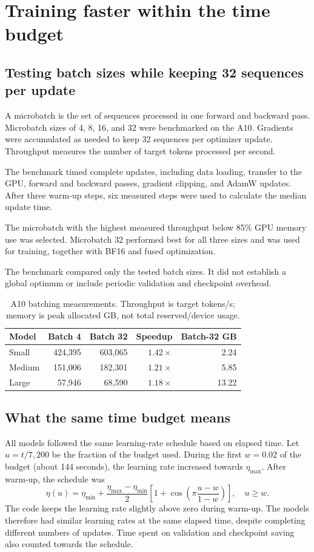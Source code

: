 \section{Training faster within the time budget}
\label{sec:efficiency}
\subsection*{Testing batch sizes while keeping 32 sequences per update}
A microbatch is the set of sequences processed in one forward and backward pass. Microbatch sizes of 4, 8, 16, and 32 were benchmarked on the A10. Gradients were accumulated as needed to keep 32 sequences per optimizer update. Throughput measures the number of target tokens processed per second.

The benchmark timed complete updates, including data loading, transfer to the GPU, forward and backward passes, gradient clipping, and AdamW updates. After three warm-up steps, six measured steps were used to calculate the median update time.

The microbatch with the highest measured throughput below 85\% GPU memory use was selected. Microbatch 32 performed best for all three sizes and was used for training, together with BF16 and fused optimization.

The benchmark compared only the tested batch sizes. It did not establish a global optimum or include periodic validation and checkpoint overhead.

\begin{table}[H]
\centering
\caption{A10 batching measurements. Throughput is target tokens/s; memory is peak allocated GB, not total reserved/device usage.}
\begin{tabular}{lrrrr}
\toprule Model & Batch 4 & Batch 32 & Speedup & Batch-32 GB\\\midrule
Small & 424,395 & 603,065 & $1.42\times$ & 2.24\\
Medium & 151,006 & 182,301 & $1.21\times$ & 5.85\\
Large & 57,946 & 68,590 & $1.18\times$ & 13.22\\\bottomrule
\end{tabular}
\end{table}

\subsection*{What the same time budget means}
All models followed the same learning-rate schedule based on elapsed time. Let $u=t/7{,}200$ be the fraction of the budget used. During the first $w=0.02$ of the budget (about 144 seconds), the learning rate increased towards $\eta_{\max}$. After warm-up, the schedule was
\begin{equation}
\eta(u)=\eta_{\min}+\frac{\eta_{\max}-\eta_{\min}}{2}
\left[1+\cos\!\left(\pi\frac{u-w}{1-w}\right)\right],\quad u\geq w.
\end{equation}
The code keeps the learning rate slightly above zero during warm-up. The models therefore had similar learning rates at the same elapsed time, despite completing different numbers of updates. Time spent on validation and checkpoint saving also counted towards the schedule.

